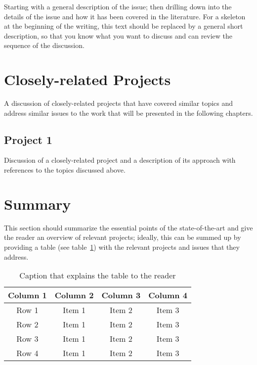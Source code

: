 Starting with a general description of the issue; then drilling down into the details of the issue and how it has been covered in the literature. For a skeleton at the beginning of the writing, this text should be replaced by a general short description, so that you know what you want to discuss and can review the sequence of the discussion.


\section{Closely-related Projects}

A discussion of closely-related projects that have covered similar topics and address similar issues to the work that will be presented in the following chapters.

\subsection{Project 1}

Discussion of a closely-related project and a description of its approach with references to the topics discussed above.
 

\section{Summary}

This section should summarize the essential points of the state-of-the-art and give the reader an overview of relevant projects; ideally, this can be summed up by providing a table (see table~\ref{table:tablelabel}) with the relevant projects and issues that they address.

\begin{table}[!h]
\begin{center}
	\begin{tabular}{|c|c|c|c|} 
	\hline
 	\bf Column 1  & \bf Column 2  & \bf Column 3 & \bf Column 4  \\
  	\hline
	Row 1 & Item 1 & Item 2 & Item 3 \\
	Row 2 & Item 1 & Item 2 & Item 3 \\
	Row 3 & Item 1 & Item 2 & Item 3 \\
	Row 4 & Item 1 & Item 2 & Item 3 \\
	\hline
	\end{tabular}
\end{center}
\caption[ToC Caption]{Caption that explains the table to the reader}	
\label{table:tablelabel}
\end{table}
